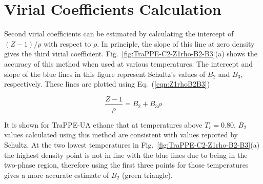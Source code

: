 \documentclass[5p,times]{elsarticle}
\begin{document}




\section{Virial Coefficients Calculation} \label{sec:VirialCalc}
Second virial coefficients can be estimated by calculating the intercept of $(Z-1)/\rho$ with respect to $\rho$. In principle, the slope of this line at zero density gives the third virial coefficient. Fig.~\ref{fig:TraPPE-C2-Z1rho-B2-B3}(a) shows the accuracy of this method when used at various temperatures. The intercept and slope of the blue lines in this figure represent Schultz's \cite{Schultz2010a} values of $B_2$ and $B_3$, respectively. These lines are plotted using Eq.~(\ref{eqn:Z1rhoB2B3})

\begin{equation}
\frac{Z-1}{\rho} = B_2 + B_3\rho \label{eqn:Z1rhoB2B3}
\end{equation}

It is shown for TraPPE-UA ethane that at temperatures above $T_r=0.80$, $B_2$ values calculated using this method are consistent with values reported by Schultz. At the two lowest temperatures in Fig.~\ref{fig:TraPPE-C2-Z1rho-B2-B3}(a) the highest density point is not in line with the blue lines due to being in the two-phase region, therefore using the first three points for those temperatures gives a more accurate estimate of $B_2$ (green triangle).  
\end{document}
